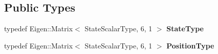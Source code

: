 \subsection*{Public Types}
\begin{DoxyCompactItemize}
\item 
typedef Eigen\+::\+Matrix$<$ State\+Scalar\+Type, 6, 1 $>$ {\bfseries State\+Type}\hypertarget{classtudat_1_1observation__models_1_1AngularPositionObservationModel_a715f0e648288253a828f7945f0bfa51b}{}\label{classtudat_1_1observation__models_1_1AngularPositionObservationModel_a715f0e648288253a828f7945f0bfa51b}

\item 
typedef Eigen\+::\+Matrix$<$ State\+Scalar\+Type, 6, 1 $>$ {\bfseries Position\+Type}\hypertarget{classtudat_1_1observation__models_1_1AngularPositionObservationModel_a1b3f3d6b7cbb9f1016db2a8145388565}{}\label{classtudat_1_1observation__models_1_1AngularPositionObservationModel_a1b3f3d6b7cbb9f1016db2a8145388565}

\end{DoxyCompactItemize}
